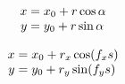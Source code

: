\documentclass[12pt, a4paper]{article}
\begin{document}
\begin{equation}
  \begin{array}{r@{\;=\;}l}
    x & x_0 + r \cos{\alpha} \\
    y & y_0 + r \sin{\alpha} 
  \end{array}
\end{equation}

\begin{equation}
  \begin{array}{r@{\;=\;}l}
    x & x_0 + r_x \cos(f_x s) \\
    y & y_0 + r_y \sin(f_y s) 
  \end{array}
\end{equation}
\end{document}
